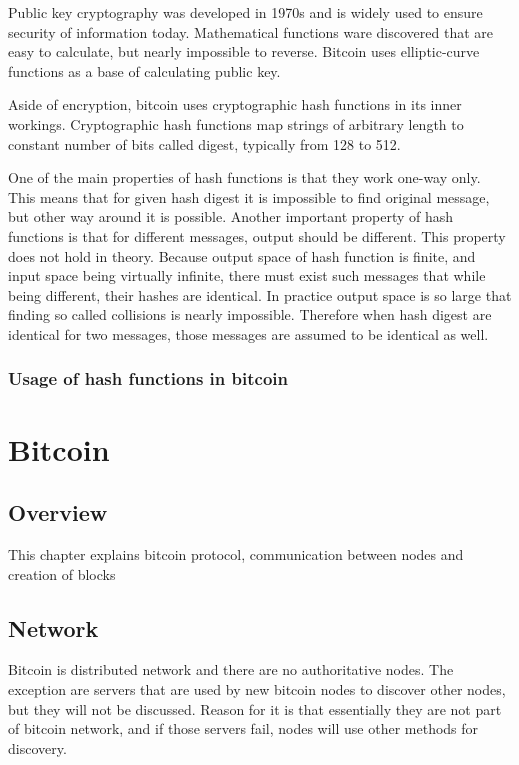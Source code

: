 \documentclass[12pt, en, eng, oneside]{mgr}
\begin{document}
Public key cryptography was developed in 1970s and is widely used to ensure security of information today. Mathematical functions ware discovered that are easy to calculate, but nearly impossible to reverse. Bitcoin uses elliptic-curve functions as a base of calculating public key.\cite{bartek}

Aside of encryption, bitcoin uses cryptographic hash functions in its inner workings. Cryptographic hash functions map strings of arbitrary length to constant number of bits called digest, typically from 128 to 512. 

One of the main properties of hash functions is that they work one-way only. This means that for given hash digest it is impossible to find original message, but other way around it is possible. Another important property of hash functions is that for different messages, output should be different. This property does not hold in theory. Because output space of hash function is finite, and input space being virtually infinite, there must exist such messages that while being different, their hashes are identical. In practice output space is so large that finding so called collisions is nearly impossible. Therefore when hash digest are identical for two messages, those messages are assumed to be identical as well.  \cite{hash-functions}


 
\subsection{Usage of hash functions in bitcoin}

\chapter{Bitcoin}

\section{Overview}

This chapter explains bitcoin protocol, communication between nodes and creation of blocks

\section{Network}
Bitcoin is distributed network and there are no authoritative nodes. The exception are servers that are used by new bitcoin nodes to discover other nodes, but they will not be discussed. Reason for it is that essentially they are not part of bitcoin network, and if those servers fail, nodes will use other methods for discovery. 
\end{document}
